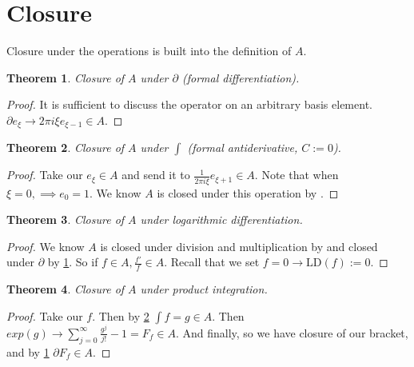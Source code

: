 \documentclass[10pt, oneside]{article}
\newtheorem{thm}{Theorem}
\begin{document}
\section{Closure}
   Closure under the operations is built into the definition of $A$.
   \begin{thm} \label{thm:1}
      Closure of $A$ under $\partial$ (formal differentiation).
   \end{thm}
   \begin{proof}
      It is sufficient to discuss the operator on an arbitrary basis element. $\partial e_\xi \to 2 \pi i \xi e_{\xi-1} \in A$.
   \end{proof}
   \begin{thm} \label{thm:2}
      Closure of $A$ under $\int$ (formal antiderivative, $C:=0$). 
   \end{thm}
   \begin{proof}
      Take our $e_\xi \in A$ and send it to $\frac{1}{2 \pi i \xi} e_{\xi + 1} \in A$. Note that when $\xi = 0, \implies e_0 = 1$. We know $A$ is closed under this operation by \cite{Hormander1958}.
   \end{proof}
   \begin{thm}
      Closure of $A$ under logarithmic differentiation. 
   \end{thm}
   \begin{proof}
      We know $A$ is closed under division and multiplication by \cite{Hormander1958} and closed under $\partial$ by \ref{thm:1}. So if $f \in A, \frac{f'}{f} \in A$.
      Recall that we set $f=0 \to \text{LD}(f) := 0$.
   \end{proof}
   \begin{thm} \label{thm:4}
      Closure of $A$ under product integration.
   \end{thm}
   \begin{proof}
      Take our $f$. Then by \ref{thm:2} $\int f = g \in A$. Then $exp(g) \to \sum_{j=0}^{\infty} \frac{g^j}{j!} - 1 = F_f \in A$. And finally, so we have closure of our bracket, and by \ref{thm:1} $\partial F_f \in A$.  
   \end{proof}
\end{document}
